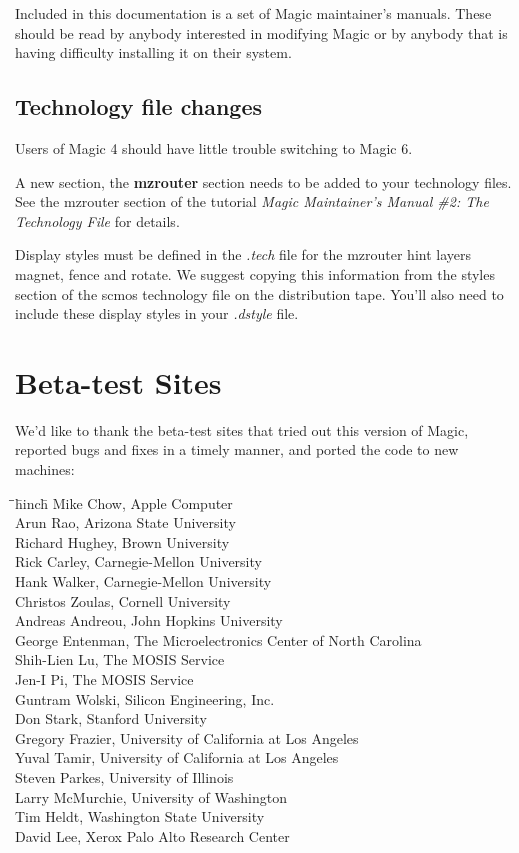 \documentclass[letterpaper,twoside,12pt]{article}
\def\hinch{\hspace*{0.5in}}
\def\starti{\begin{center}\begin{tabbing}\hinch\=\hinch\=\hinch\=hinch\hinch\=\kill}
\def\endi{\end{tabbing}\end{center}}
\begin{document}
Included in this documentation
is a set of Magic maintainer's manuals.  These should be read by anybody
interested in modifying Magic or by anybody that is having difficulty 
installing it on their system.

\subsection{Technology file changes}

Users of Magic 4 should have little trouble switching to Magic 6.  

A new section, the {\bfseries mzrouter} section needs to be added to your technology
files.  See the mzrouter section of the 
tutorial {\itshape Magic Maintainer's Manual \#2: The Technology File} 
for details.

Display styles must be defined in the {\itshape .tech} file
for the mzrouter hint layers magnet, fence and rotate.  We
suggest copying this information from the styles section of the
scmos technology file on the distribution tape.  You'll also need to include
these display styles in your {\itshape .dstyle} file.

\section{Beta-test Sites}

We'd like to thank the beta-test sites that tried out this version of Magic,
reported bugs and fixes in a timely manner, and ported the code to new 
machines:  

\starti
\> Mike Chow, Apple Computer \\
\> Arun Rao, Arizona State University \\
\> Richard Hughey, Brown University \\
\> Rick Carley, Carnegie-Mellon University \\
\> Hank Walker, Carnegie-Mellon University \\
\> Christos Zoulas, Cornell University \\
\> Andreas Andreou, John Hopkins University \\
\> George Entenman, The Microelectronics Center of North Carolina  \\
\> Shih-Lien Lu, The MOSIS Service \\
\> Jen-I Pi, The MOSIS Service \\
\> Guntram Wolski,	Silicon Engineering, Inc. \\
\> Don Stark, Stanford University \\
\> Gregory Frazier, University of California at Los Angeles \\
\> Yuval Tamir, University of California at Los Angeles \\
\> Steven Parkes, University of Illinois \\
\> Larry McMurchie, University of Washington \\
\> Tim Heldt, Washington State University \\
\> David Lee, Xerox Palo Alto Research Center \\
\endi
\end{document}
